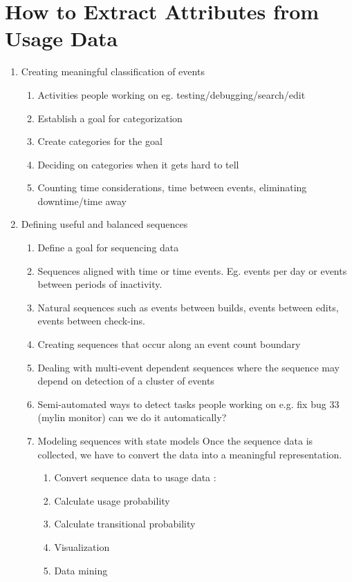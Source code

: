 \section{ How to Extract Attributes from Usage Data}


  \begin{enumerate}
  \item Creating meaningful classification of events
	\begin{enumerate}
	\item
	Activities people working on eg. testing/debugging/search/edit
	\item
	Establish a goal for categorization
	\item
	Create categories for the goal
	\item
	Deciding on categories when it gets hard to tell
	\item
	Counting time considerations, time between events, eliminating downtime/time away
	\end{enumerate}
  \item Defining useful and balanced sequences %
	\begin{enumerate}
	\item
	Define a goal for sequencing data
	\item
	Sequences aligned with time or time events.  Eg. events per day or events
	between periods of inactivity.
	\item
	Natural sequences such as events between builds, events between edits, events between check-ins.
	\item
	Creating sequences that occur along an event count boundary
	\item 
	Dealing with multi-event dependent sequences where the sequence may depend on detection of a cluster of events
	\item
	Semi-automated ways to detect tasks people working on e.g. fix bug 33 (mylin monitor) can we do it automatically?

  \item  Modeling sequences with state models %
  Once the sequence data is collected, we have to convert the data into a meaningful representation. 
                \begin{enumerate}
                \item Convert sequence data to usage data : 
                \item Calculate usage probability
                \item Calculate transitional probability
                \item Visualization
                \item Data mining
                \end{enumerate}
	\end{enumerate}

  \end{enumerate}
